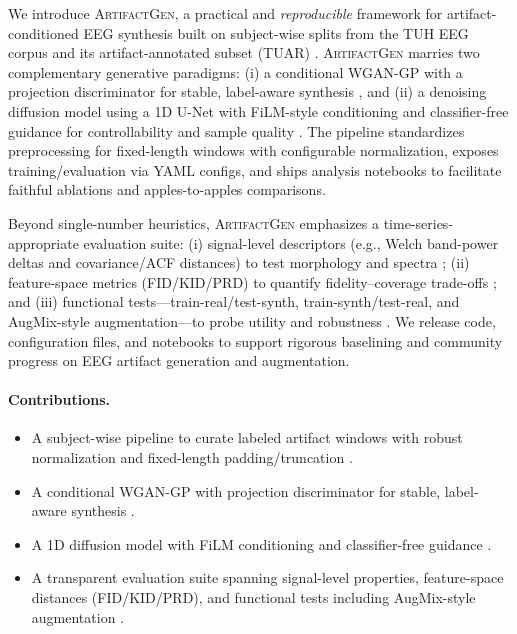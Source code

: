 \documentclass{article}
\begin{document}
We introduce \textsc{ArtifactGen}, a practical and \emph{reproducible} framework for artifact-conditioned EEG synthesis built on subject-wise splits from the TUH EEG corpus and its artifact-annotated subset (TUAR) \citep{obeid2016tuh,hamid2020tuar}. \textsc{ArtifactGen} marries two complementary generative paradigms: (i) a conditional WGAN-GP with a projection discriminator for stable, label-aware synthesis \citep{gulrajani2017improved,miyato2018cgans}, and (ii) a denoising diffusion model using a 1D U-Net with FiLM-style conditioning \citep{perez2018film} and classifier-free guidance for controllability and sample quality \citep{ho2020denoising,ho2022classifierfree}. The pipeline standardizes preprocessing for fixed-length windows with configurable normalization, exposes training/evaluation via YAML configs, and ships analysis notebooks to facilitate faithful ablations and apples-to-apples comparisons.

Beyond single-number heuristics, \textsc{ArtifactGen} emphasizes a time-series-appropriate evaluation suite: (i) signal-level descriptors (e.g., Welch band-power deltas and covariance/ACF distances) to test morphology and spectra \citep{welch1967psd}; (ii) feature-space metrics (FID/KID/PRD) to quantify fidelity–coverage trade-offs \citep{heusel2017gans,binkowski2018demystifying,sajjadi2018assessing}; and (iii) functional tests—train-real/test-synth, train-synth/test-real, and AugMix-style augmentation—to probe utility and robustness \citep{hendrycks2020augmix}. We release code, configuration files, and notebooks to support rigorous baselining and community progress on EEG artifact generation and augmentation.

\paragraph{Contributions.}
\begin{itemize}
    \item A subject-wise pipeline to curate labeled artifact windows with robust normalization and fixed-length padding/truncation \citep{obeid2016tuh,hamid2020tuar}.
    \item A conditional WGAN-GP with projection discriminator for stable, label-aware synthesis \citep{gulrajani2017improved,miyato2018cgans}.
    \item A 1D diffusion model with FiLM conditioning and classifier-free guidance \citep{perez2018film,ho2020denoising,ho2022classifierfree}.
    \item A transparent evaluation suite spanning signal-level properties, feature-space distances (FID/KID/PRD), and functional tests including AugMix-style augmentation \citep{heusel2017gans,binkowski2018demystifying,sajjadi2018assessing,hendrycks2020augmix,welch1967psd}.
\end{itemize}
\end{document}
